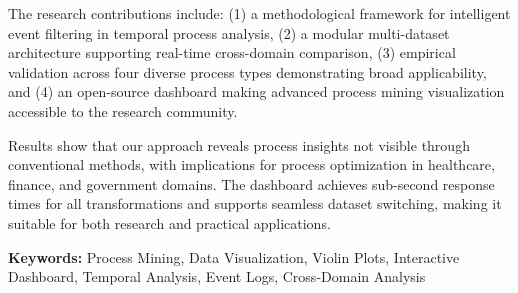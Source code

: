 The research contributions include: (1) a methodological framework for intelligent event filtering in temporal process analysis, (2) a modular multi-dataset architecture supporting real-time cross-domain comparison, (3) empirical validation across four diverse process types demonstrating broad applicability, and (4) an open-source dashboard making advanced process mining visualization accessible to the research community.

Results show that our approach reveals process insights not visible through conventional methods, with implications for process optimization in healthcare, finance, and government domains. The dashboard achieves sub-second response times for all transformations and supports seamless dataset switching, making it suitable for both research and practical applications.

\textbf{Keywords:} Process Mining, Data Visualization, Violin Plots, Interactive Dashboard, Temporal Analysis, Event Logs, Cross-Domain Analysis

\cleardoublepage
